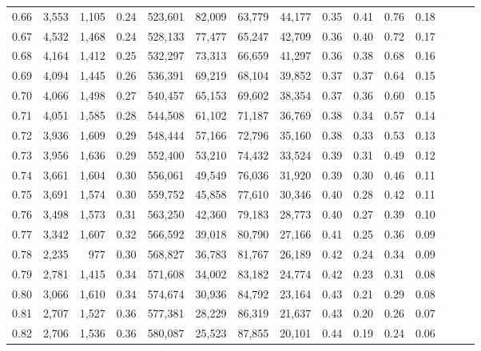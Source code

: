 \begin{tabular}{rrrrrrrrrrrrrrr}
0.66 &   3,553 &  1,105 &  0.24 &  523,601 &   82,009 &   63,779 &   44,177 &  0.35 &  0.41 &  0.76 &      0.18 \\
0.67 &   4,532 &  1,468 &  0.24 &  528,133 &   77,477 &   65,247 &   42,709 &  0.36 &  0.40 &  0.72 &      0.17 \\
0.68 &   4,164 &  1,412 &  0.25 &  532,297 &   73,313 &   66,659 &   41,297 &  0.36 &  0.38 &  0.68 &      0.16 \\
0.69 &   4,094 &  1,445 &  0.26 &  536,391 &   69,219 &   68,104 &   39,852 &  0.37 &  0.37 &  0.64 &      0.15 \\
0.70 &   4,066 &  1,498 &  0.27 &  540,457 &   65,153 &   69,602 &   38,354 &  0.37 &  0.36 &  0.60 &      0.15 \\
0.71 &   4,051 &  1,585 &  0.28 &  544,508 &   61,102 &   71,187 &   36,769 &  0.38 &  0.34 &  0.57 &      0.14 \\
0.72 &   3,936 &  1,609 &  0.29 &  548,444 &   57,166 &   72,796 &   35,160 &  0.38 &  0.33 &  0.53 &      0.13 \\
0.73 &   3,956 &  1,636 &  0.29 &  552,400 &   53,210 &   74,432 &   33,524 &  0.39 &  0.31 &  0.49 &      0.12 \\
0.74 &   3,661 &  1,604 &  0.30 &  556,061 &   49,549 &   76,036 &   31,920 &  0.39 &  0.30 &  0.46 &      0.11 \\
0.75 &   3,691 &  1,574 &  0.30 &  559,752 &   45,858 &   77,610 &   30,346 &  0.40 &  0.28 &  0.42 &      0.11 \\
0.76 &   3,498 &  1,573 &  0.31 &  563,250 &   42,360 &   79,183 &   28,773 &  0.40 &  0.27 &  0.39 &      0.10 \\
0.77 &   3,342 &  1,607 &  0.32 &  566,592 &   39,018 &   80,790 &   27,166 &  0.41 &  0.25 &  0.36 &      0.09 \\
0.78 &   2,235 &    977 &  0.30 &  568,827 &   36,783 &   81,767 &   26,189 &  0.42 &  0.24 &  0.34 &      0.09 \\
0.79 &   2,781 &  1,415 &  0.34 &  571,608 &   34,002 &   83,182 &   24,774 &  0.42 &  0.23 &  0.31 &      0.08 \\
0.80 &   3,066 &  1,610 &  0.34 &  574,674 &   30,936 &   84,792 &   23,164 &  0.43 &  0.21 &  0.29 &      0.08 \\
0.81 &   2,707 &  1,527 &  0.36 &  577,381 &   28,229 &   86,319 &   21,637 &  0.43 &  0.20 &  0.26 &      0.07 \\
0.82 &   2,706 &  1,536 &  0.36 &  580,087 &   25,523 &   87,855 &   20,101 &  0.44 &  0.19 &  0.24 &      0.06 \\

\end{tabular}
